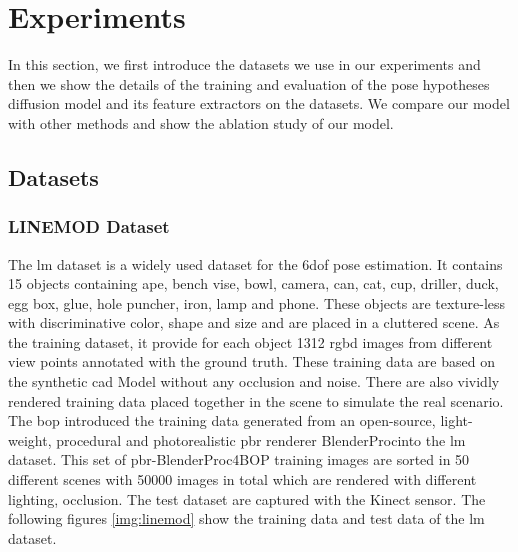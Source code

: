 \documentclass[12pt,DIV14,BCOR12mm,a4paper,footinclude=false,headinclude,parskip=half-,twoside,openright,cleardoublepage=empty,toc=index,bibliography=totoc,listof=totoc]{scrreprt}
\numberwithin{equation}{chapter}
\begin{document}
\chapter{Experiments}
In this section, we first introduce the datasets we use in our experiments and then we show the details of the training and evaluation of the pose hypotheses diffusion model and its feature extractors on the datasets. We compare our model with other methods and show the ablation study of our model.
\section{Datasets}
\subsection{LINEMOD Dataset}
The \gls{lm} dataset \cite{hinterstoisser2012model} is a widely used dataset for the \gls{6dof} pose estimation. It contains 15 objects containing ape, bench vise, bowl, camera, can, cat, cup, driller, duck, egg box, glue, hole puncher, iron, lamp and phone. These objects are texture-less with discriminative color, shape and size and are placed in a cluttered scene. As the training dataset, it provide for each object 1312 \gls{rgbd} images from different view points annotated with the ground truth. These training data are based on the synthetic \gls{cad} Model without any occlusion and noise. There are also vividly rendered training data placed together in the scene to simulate the real scenario. The \gls{bop} \cite{hodan2018bop}introduced the training data generated from an open-source, light-weight, procedural and photorealistic \gls{pbr} renderer BlenderProc\cite{denninger2019blenderproc}into the \gls{lm} dataset.
This set of \gls{pbr}-BlenderProc4BOP training images are sorted in 50 different scenes with 50000 images in total which are rendered with different lighting, occlusion. The test dataset are captured with the Kinect sensor. The following figures \ref{img:linemod} show the training data and test data of the \gls{lm} dataset.
\end{document}
